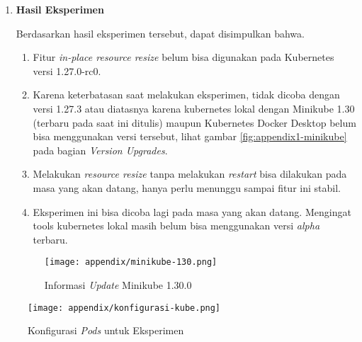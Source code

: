 \begin{enumerate}
    \item \textbf{Hasil Eksperimen}
    
        Berdasarkan hasil eksperimen tersebut, dapat disimpulkan bahwa.

        \begin{enumerate}
            \item Fitur \textit{in-place resource resize} belum bisa digunakan pada Kubernetes versi 1.27.0-rc0.
            \item Karena keterbatasan saat melakukan eksperimen, tidak dicoba dengan versi 1.27.3 atau diatasnya karena kubernetes lokal dengan Minikube 1.30 (terbaru pada saat ini ditulis) maupun Kubernetes Docker Desktop belum bisa menggunakan versi tersebut, lihat gambar \ref{fig:appendix1-minikube} pada bagian \textit{Version Upgrades}.
            \item Melakukan \textit{resource resize} tanpa melakukan \textit{restart} bisa dilakukan pada masa yang akan datang, hanya perlu menunggu sampai fitur ini stabil.
            \item Eksperimen ini bisa dicoba lagi pada masa yang akan datang. Mengingat tools kubernetes lokal masih belum bisa menggunakan versi \textit{alpha} terbaru.
        \end{enumerate}

        \begin{figure}[h]
            \centering
            \texttt{[image: appendix/minikube-130.png]}
            \caption{Informasi \textit{Update} Minikube 1.30.0}
            \label{fig:appendix1-kube-doc}
        \end{figure}
\end{enumerate}

\begin{figure}[h]
    \centering
    \texttt{[image: appendix/konfigurasi-kube.png]}
    \caption{Konfigurasi \textit{Pods} untuk Eksperimen}
    \label{fig:appendix1-kube-config}
\end{figure}